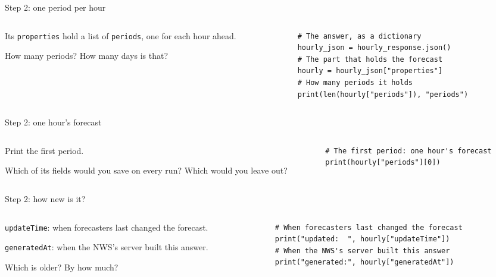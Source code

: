 \documentclass[9pt,aspectratio=169]{beamer}
\begin{document}
\begin{frame}[fragile]{Step 2: one period per hour}
    \begin{columns}[T]
        \begin{column}{0.37\textwidth}
            Its \texttt{properties} hold a list of \texttt{periods}, one for each hour ahead.

            \medskip
            How many periods? How many days is that?
        \end{column}
        \begin{column}{0.6\textwidth}
\begin{lstlisting}
# The answer, as a dictionary
hourly_json = hourly_response.json()
# The part that holds the forecast
hourly = hourly_json["properties"]
# How many periods it holds
print(len(hourly["periods"]), "periods")
\end{lstlisting}
        \end{column}
    \end{columns}
\end{frame}

\begin{frame}[fragile]{Step 2: one hour's forecast}
    \begin{columns}[T]
        \begin{column}{0.37\textwidth}
            Print the first period.

            \medskip
            Which of its fields would you save on every run? Which would you leave out?
        \end{column}
        \begin{column}{0.6\textwidth}
\begin{lstlisting}
# The first period: one hour's forecast
print(hourly["periods"][0])
\end{lstlisting}
        \end{column}
    \end{columns}
\end{frame}

\begin{frame}[fragile]{Step 2: how new is it?}
    \begin{columns}[T]
        \begin{column}{0.37\textwidth}
            \texttt{updateTime}: when forecasters last changed the forecast.

            \medskip
            \texttt{generatedAt}: when the NWS's server built this answer.

            \medskip
            Which is older? By how much?
        \end{column}
        \begin{column}{0.6\textwidth}
\begin{lstlisting}
# When forecasters last changed the forecast
print("updated:  ", hourly["updateTime"])
# When the NWS's server built this answer
print("generated:", hourly["generatedAt"])
\end{lstlisting}
        \end{column}
    \end{columns}
\end{frame}
\end{document}
